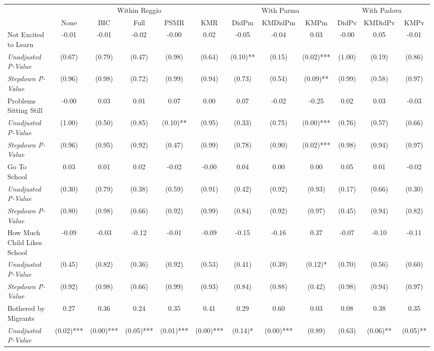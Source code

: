 \begin{tabular}{l c c c c c c c c c c c}
\toprule
& \multicolumn{5}{c}{Within Reggio} & \multicolumn{3}{c}{With Parma} & \multicolumn{3}{c}{With Padova} \\\cmidrule(lr){2-6} \cmidrule(lr){7-9} \cmidrule(lr){10-12}
 & None & BIC & Full & PSMR & KMR & DidPm & KMDidPm & KMPm & DidPv & KMDidPv & KMPv \\
\midrule
Not Excited to Learn & -0.01 & -0.01 & -0.02 & -0.00 & 0.02 & -0.05 & -0.04 & 0.03 & -0.00 & 0.05 & -0.01 \\
\quad \textit{Unadjusted P-Value} & (0.67) & (0.79) & (0.47) & (0.98) & (0.64) & (0.10)** & (0.15) & (0.02)*** & (1.00) & (0.19) & (0.86) \\
\quad \textit{Stepdown P-Value} & (0.96) & (0.98) & (0.72) & (0.99) & (0.94) & (0.73) & (0.54) & (0.09)** & (0.99) & (0.58) & (0.97) \\
Problems Sitting Still & -0.00 & 0.03 & 0.01 & 0.07 & 0.00 & 0.07 & -0.02 & -0.25 & 0.02 & 0.03 & -0.03 \\
\quad \textit{Unadjusted P-Value} & (1.00) & (0.50) & (0.85) & (0.10)** & (0.95) & (0.33) & (0.75) & (0.00)*** & (0.76) & (0.57) & (0.66) \\
\quad \textit{Stepdown P-Value} & (0.96) & (0.95) & (0.92) & (0.47) & (0.99) & (0.78) & (0.90) & (0.02)*** & (0.98) & (0.94) & (0.97) \\
Go To School & 0.03 & 0.01 & 0.02 & -0.02 & -0.00 & 0.04 & 0.00 & 0.00 & 0.05 & 0.01 & -0.02 \\
\quad \textit{Unadjusted P-Value} & (0.30) & (0.79) & (0.38) & (0.59) & (0.91) & (0.42) & (0.92) & (0.93) & (0.17) & (0.66) & (0.30) \\
\quad \textit{Stepdown P-Value} & (0.80) & (0.98) & (0.66) & (0.92) & (0.99) & (0.84) & (0.92) & (0.97) & (0.45) & (0.94) & (0.82) \\
How Much Child Likes School & -0.09 & -0.03 & -0.12 & -0.01 & -0.09 & -0.15 & -0.16 & 0.37 & -0.07 & -0.10 & -0.11 \\
\quad \textit{Unadjusted P-Value} & (0.45) & (0.82) & (0.36) & (0.92) & (0.53) & (0.41) & (0.39) & (0.12)* & (0.70) & (0.56) & (0.60) \\
\quad \textit{Stepdown P-Value} & (0.92) & (0.98) & (0.66) & (0.99) & (0.93) & (0.84) & (0.88) & (0.42) & (0.98) & (0.94) & (0.97) \\
Bothered by Migrants & 0.27 & 0.36 & 0.24 & 0.35 & 0.41 & 0.29 & 0.60 & 0.03 & 0.08 & 0.38 & 0.35 \\
\quad \textit{Unadjusted P-Value} & (0.02)*** & (0.00)*** & (0.05)*** & (0.01)*** & (0.00)*** & (0.14)* & (0.00)*** & (0.89) & (0.63) & (0.06)** & (0.05)** \\

\end{tabular}
